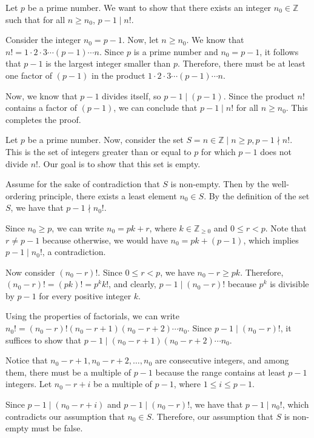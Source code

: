 \documentclass[12pt,openany]{book}
\theoremstyle{definition}
\begin{document}
	Let $p$ be a prime number. We want to show that there exists an integer $n_0 \in \mathbb{Z}$ such that for all $n \geq n_0$, $p-1 \mid n!$. 
	
	Consider the integer $n_0 = p - 1$. Now, let $n \geq n_0$. We know that $n! = 1 \cdot 2 \cdot 3 \cdots (p-1) \cdots n$. Since $p$ is a prime number and $n_0 = p - 1$, it follows that $p-1$ is the largest integer smaller than $p$. Therefore, there must be at least one factor of $(p-1)$ in the product $1 \cdot 2 \cdot 3 \cdots (p-1) \cdots n$. 
	
	Now, we know that $p-1$ divides itself, so $p-1 \mid (p-1)$. Since the product $n!$ contains a factor of $(p-1)$, we can conclude that $p-1 \mid n!$ for all $n \geq n_0$. This completes the proof.
	
	\newpage
	Let $p$ be a prime number. Now, consider the set $S = {n \in \mathbb{Z} \mid n \geq p, p-1 \nmid n!}$. This is the set of integers greater than or equal to $p$ for which $p-1$ does not divide $n!$. Our goal is to show that this set is empty.
	
	Assume for the sake of contradiction that $S$ is non-empty. Then by the well-ordering principle, there exists a least element $n_0 \in S$. By the definition of the set $S$, we have that $p-1 \nmid n_0!$.
	
	Since $n_0 \geq p$, we can write $n_0 = pk + r$, where $k \in \mathbb{Z}_{\geq 0}$ and $0 \leq r < p$. Note that $r \neq p-1$ because otherwise, we would have $n_0 = pk + (p-1)$, which implies $p-1 \mid n_0!$, a contradiction.
	
	Now consider $(n_0 - r)!$. Since $0 \leq r < p$, we have $n_0 - r \geq pk$. Therefore, $(n_0 - r)! = (pk)! = p^k k!$, and clearly, $p-1 \mid (n_0 - r)!$ because $p^k$ is divisible by $p-1$ for every positive integer $k$.
	
	Using the properties of factorials, we can write $n_0! = (n_0 - r)!(n_0 - r + 1)(n_0 - r + 2) \cdots n_0$. Since $p-1 \mid (n_0 - r)!$, it suffices to show that $p-1 \mid (n_0 - r + 1)(n_0 - r + 2) \cdots n_0$.
	
	Notice that $n_0 - r + 1, n_0 - r + 2, \dots, n_0$ are consecutive integers, and among them, there must be a multiple of $p-1$ because the range contains at least $p-1$ integers. Let $n_0 - r + i$ be a multiple of $p-1$, where $1 \leq i \leq p-1$.
	
	Since $p-1 \mid (n_0 - r + i)$ and $p-1 \mid (n_0 - r)!$, we have that $p-1 \mid n_0!$, which contradicts our assumption that $n_0 \in S$. Therefore, our assumption that $S$ is non-empty must be false.
	
\end{document}
